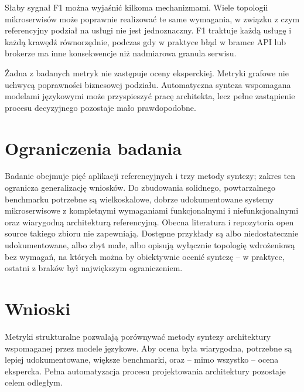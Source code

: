 Słaby sygnał F1 można wyjaśnić kilkoma mechanizmami. Wiele topologii mikroserwisów może poprawnie realizować te same wymagania, w związku z czym referencyjny podział na usługi nie jest jednoznaczny. F1 traktuje każdą usługę i każdą krawędź równorzędnie, podczas gdy w praktyce błąd w bramce API lub brokerze ma inne konsekwencje niż nadmiarowa granula serwisu.

Żadna z badanych metryk nie zastępuje oceny eksperckiej. Metryki grafowe nie uchwycą poprawności biznesowej podziału. Automatyczna synteza wspomagana modelami językowymi może przyspieszyć pracę architekta, lecz pełne zastąpienie procesu decyzyjnego pozostaje mało prawdopodobne.

\section{Ograniczenia badania}

Badanie obejmuje pięć aplikacji referencyjnych i trzy metody syntezy; zakres ten ogranicza generalizację wniosków. Do zbudowania solidnego, powtarzalnego benchmarku potrzebne są wielkoskalowe, dobrze udokumentowane systemy mikroserwisowe z kompletnymi wymaganiami funkcjonalnymi i niefunkcjonalnymi oraz wiarygodną architekturą referencyjną. Obecna literatura i repozytoria open source takiego zbioru nie zapewniają. Dostępne przykłady są albo niedostatecznie udokumentowane, albo zbyt małe, albo opisują wyłącznie topologię wdrożeniową bez wymagań, na których można by obiektywnie ocenić syntezę -- w praktyce, ostatni z braków był największym ograniczeniem.

\section{Wnioski}

Metryki strukturalne pozwalają porównywać metody syntezy architektury wspomaganej przez modele językowe. Aby ocena była wiarygodna, potrzebne są lepiej udokumentowane, większe benchmarki, oraz -- mimo wszystko -- ocena ekspercka. Pełna automatyzacja procesu projektowania architektury pozostaje celem odległym.

